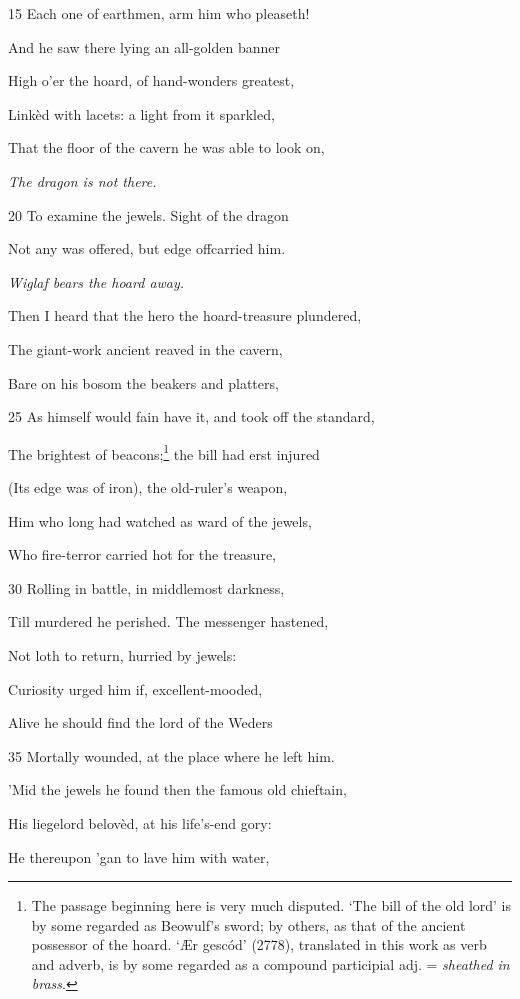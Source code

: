 15
Each one of earthmen, arm him who pleaseth!

And he saw there lying an all-golden banner

High o’er the hoard, of hand-wonders greatest,

Linkèd with lacets: a light from it sparkled,

That the floor of the cavern he was able to look on,

\emph{The dragon is not
there.}

20
To examine the jewels. Sight of the dragon

Not any was offered, but edge offcarried him.

\emph{Wiglaf bears the
hoard away.}

Then I heard that the hero the hoard-treasure plundered,

The giant-work ancient reaved in the cavern,

Bare on his bosom the beakers and platters,

25
As himself would fain have it, and took off the standard,

The brightest of beacons;\footnote{The passage beginning here is very much disputed. ‘The bill of the old
lord’ is by some regarded as Beowulf’s sword; by others, as that of the
ancient possessor of the hoard. ‘Ær gescód’ (2778), translated in this work
as verb and adverb, is by some regarded as a compound participial adj. =
\emph{sheathed in brass}.} the bill had erst injured

(Its edge was of iron), the old-ruler’s weapon,

Him who long had watched as ward of the jewels,

Who fire-terror carried hot for the treasure,

30
Rolling in battle, in middlemost darkness,

Till murdered he perished. The messenger hastened,

Not loth to return, hurried by jewels:

Curiosity urged him if, excellent-mooded,

Alive he should find the lord of the Weders

35
Mortally wounded, at the place where he left him.

’Mid the jewels he found then the famous old chieftain,

His liegelord belovèd, at his life’s-end gory:

He thereupon ’gan to lave him with water,

